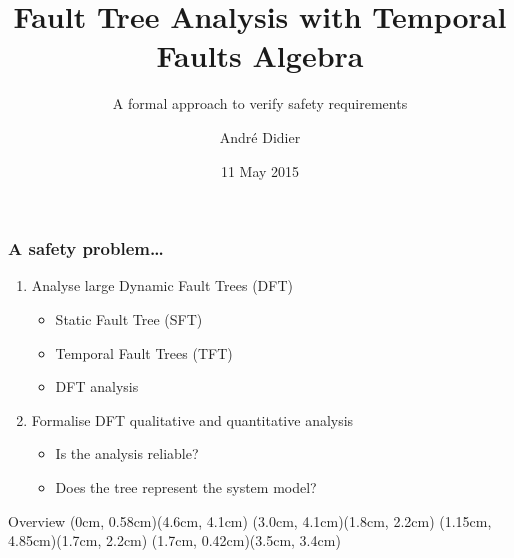 \documentclass{beamer}
\title{Fault Tree Analysis with Temporal Faults Algebra}
\subtitle{A formal approach to verify safety requirements}
\author{André Didier}
\date{11 May 2015}
\begin{document}
\begin{frame}
\titlepage
\end{frame}

\begin{frame}
\frametitle{A safety problem\ldots}
\begin{enumerate}
  \item Analyse \alert<4>{large} Dynamic Fault Trees (DFT)\\
    \begin{minipage}[c]{4.60cm}
        \begin{itemize}
          \item Static Fault Tree (SFT) 
          \item Temporal Fault Trees (TFT)
          \item DFT analysis 
        \end{itemize}
    \end{minipage}
    \begin{minipage}[c]{5.3cm}
    \end{minipage}
  \item Formalise DFT qualitative and quantitative analysis
    \begin{itemize}
      \item<3-> Is the analysis reliable?
      \item<3-> Does the tree represent the system model?
    \end{itemize}
\end{enumerate}
\end{frame}

\begin{frame}{Overview}
(0cm, 0.58cm)(4.6cm, 4.1cm)
(3.0cm, 4.1cm)(1.8cm, 2.2cm)
(1.15cm, 4.85cm)(1.7cm, 2.2cm)
(1.7cm, 0.42cm)(3.5cm, 3.4cm)
\end{frame}
\end{document}
